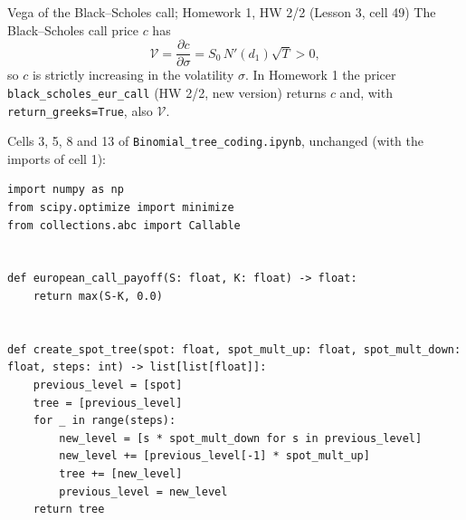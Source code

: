 \documentclass[11pt,a4paper]{article}
\newcommand{\subhead}[1]{\par\medskip\noindent{\large\bfseries #1}\par\smallskip\noindent\ignorespaces}
\begin{document}
\begin{thmbox}{Vega of the Black--Scholes call; Homework 1, HW 2/2 (Lesson 3, cell 49)}
The Black--Scholes call price $c$ has
\begin{equation}\label{eq:vega}
\mathcal V=\frac{\partial c}{\partial\sigma}=S_0\,N'(d_1)\sqrt T>0 ,
\end{equation}
so $c$ is strictly increasing in the volatility $\sigma$. In Homework 1 the pricer \texttt{black\_scholes\_eur\_call} (HW 2/2, new version) returns $c$ and, with \texttt{return\_greeks=True}, also $\mathcal V$.
\end{thmbox}

\subhead{The code of the lecture.} Cells 3, 5, 8 and 13 of \texttt{Binomial\_tree\_coding.ipynb}, unchanged (with the imports of cell 1):
\par\smallskip\noindent\begin{minipage}{\linewidth}\begin{lstlisting}[style=prof,title={lecture code (\texttt{prof\_tree.py})}]
import numpy as np
from scipy.optimize import minimize
from collections.abc import Callable


def european_call_payoff(S: float, K: float) -> float:
    return max(S-K, 0.0)


def create_spot_tree(spot: float, spot_mult_up: float, spot_mult_down: float, steps: int) -> list[list[float]]:
    previous_level = [spot]
    tree = [previous_level]
    for _ in range(steps):
        new_level = [s * spot_mult_down for s in previous_level]
        new_level += [previous_level[-1] * spot_mult_up]
        tree += [new_level]
        previous_level = new_level
    return tree



\end{lstlisting}
\end{minipage}
\end{document}
